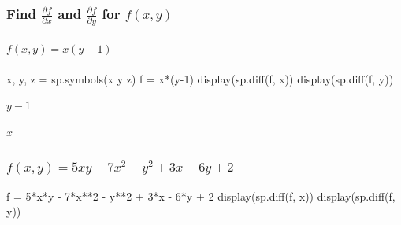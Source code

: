 \documentclass[
  letterpaper,
  DIV=11,
  numbers=noendperiod]{scrartcl}
\let\oldparagraph\paragraph
\renewcommand{\paragraph}[1]{\oldparagraph{#1}\mbox{}}
\newenvironment{Shaded}{\begin{snugshade}}{\end{snugshade}}
\newcommand{\DecValTok}[1]{\textcolor[rgb]{0.68,0.00,0.00}{#1}}
\newcommand{\NormalTok}[1]{\textcolor[rgb]{0.00,0.23,0.31}{#1}}
\newcommand{\OperatorTok}[1]{\textcolor[rgb]{0.37,0.37,0.37}{#1}}
\newcommand{\StringTok}[1]{\textcolor[rgb]{0.13,0.47,0.30}{#1}}
\begin{document}
\hypertarget{find-fracpartial-fpartial-x-and-fracpartial-fpartial-y-for-fx-y}{%
\subsubsection{\texorpdfstring{Find \(\frac{\partial f}{\partial x}\)
and \(\frac{\partial f}{\partial y}\) for
\(f(x, y)\)}{Find \textbackslash frac\{\textbackslash partial f\}\{\textbackslash partial x\} and \textbackslash frac\{\textbackslash partial f\}\{\textbackslash partial y\} for f(x, y)}}\label{find-fracpartial-fpartial-x-and-fracpartial-fpartial-y-for-fx-y}}

\hypertarget{fx-y-xy-1}{%
\paragraph{\texorpdfstring{\(f(x, y) = x(y-1)\)}{f(x, y) = x(y-1)}}\label{fx-y-xy-1}}

\begin{Shaded}
\begin{Highlighting}[numbers=left,,]
\NormalTok{x, y, z }\OperatorTok{=}\NormalTok{ sp.symbols(}\StringTok{\textquotesingle{}x y z\textquotesingle{}}\NormalTok{)}
\NormalTok{f }\OperatorTok{=}\NormalTok{ x}\OperatorTok{*}\NormalTok{(y}\OperatorTok{{-}}\DecValTok{1}\NormalTok{)}
\NormalTok{display(sp.diff(f, x))}
\NormalTok{display(sp.diff(f, y))}
\end{Highlighting}
\end{Shaded}

$\displaystyle y - 1$

$\displaystyle x$

\hypertarget{fx-y-5xy---7x2---y2-3x---6y-2}{%
\subsubsection{\texorpdfstring{\(f(x, y) = 5xy - 7x^2 - y^2 + 3x - 6y +2\)}{f(x, y) = 5xy - 7x\^{}2 - y\^{}2 + 3x - 6y +2}}\label{fx-y-5xy---7x2---y2-3x---6y-2}}

\begin{Shaded}
\begin{Highlighting}[numbers=left,,]
\NormalTok{f }\OperatorTok{=} \DecValTok{5}\OperatorTok{*}\NormalTok{x}\OperatorTok{*}\NormalTok{y }\OperatorTok{{-}} \DecValTok{7}\OperatorTok{*}\NormalTok{x}\OperatorTok{**}\DecValTok{2} \OperatorTok{{-}}\NormalTok{ y}\OperatorTok{**}\DecValTok{2} \OperatorTok{+} \DecValTok{3}\OperatorTok{*}\NormalTok{x }\OperatorTok{{-}} \DecValTok{6}\OperatorTok{*}\NormalTok{y }\OperatorTok{+} \DecValTok{2}
\NormalTok{display(sp.diff(f, x))}
\NormalTok{display(sp.diff(f, y))}
\end{Highlighting}
\end{Shaded}
\end{document}
